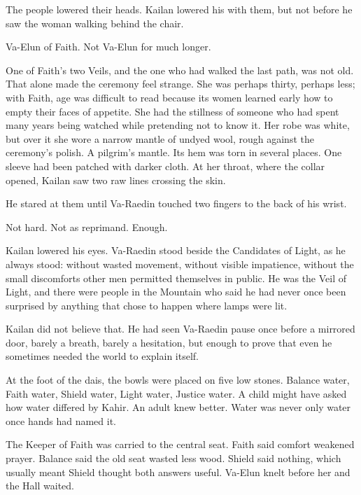 The people lowered their heads. Kailan lowered his with them, but not before he saw the woman walking behind the chair.\par

Va-Elun of Faith. Not Va-Elun for much longer.\par

One of Faith’s two Veils, and the one who had walked the last path, was not old. That alone made the ceremony feel strange. She was perhaps thirty, perhaps less; with Faith, age was difficult to read because its women learned early how to empty their faces of appetite. She had the stillness of someone who had spent many years being watched while pretending not to know it. Her robe was white, but over it she wore a narrow mantle of undyed wool, rough against the ceremony’s polish. A pilgrim’s mantle. Its hem was torn in several places. One sleeve had been patched with darker cloth. At her throat, where the collar opened, Kailan saw two raw lines crossing the skin.\par

He stared at them until Va-Raedin touched two fingers to the back of his wrist.\par

Not hard. Not as reprimand. Enough.\par

Kailan lowered his eyes. Va-Raedin stood beside the Candidates of Light, as he always stood: without wasted movement, without visible impatience, without the small discomforts other men permitted themselves in public. He was the Veil of Light, and there were people in the Mountain who said he had never once been surprised by anything that chose to happen where lamps were lit.\par

Kailan did not believe that. He had seen Va-Raedin pause once before a mirrored door, barely a breath, barely a hesitation, but enough to prove that even he sometimes needed the world to explain itself.\par

At the foot of the dais, the bowls were placed on five low stones. Balance water, Faith water, Shield water, Light water, Justice water. A child might have asked how water differed by Kahir. An adult knew better. Water was never only water once hands had named it.\par

The Keeper of Faith was carried to the central seat. Faith said comfort weakened prayer. Balance said the old seat wasted less wood. Shield said nothing, which usually meant Shield thought both answers useful. Va-Elun knelt before her and the Hall waited.\par

